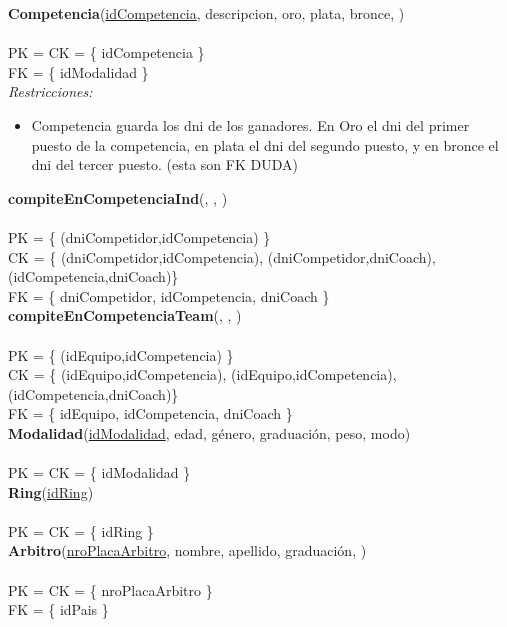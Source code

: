 \noindent\textbf{Competencia}(\uline{idCompetencia}, descripcion, oro, plata, bronce, )
\\
\\
PK = CK = \{ idCompetencia \} \\
FK = \{ idModalidad \} \\

\textit{Restricciones:}
\begin{itemize}
	\item Competencia guarda los dni de los ganadores. En Oro el dni del primer puesto de la competencia, en plata el dni del segundo puesto, y en bronce el dni del tercer puesto. (esta son FK DUDA)
\end{itemize}

\noindent\textbf{compiteEnCompetenciaInd}(, , )
\\
\\
PK = \{ (dniCompetidor,idCompetencia) \} \\
CK = \{ (dniCompetidor,idCompetencia), (dniCompetidor,dniCoach), (idCompetencia,dniCoach)\} \\
FK = \{ dniCompetidor, idCompetencia, dniCoach \} \\

\noindent\textbf{compiteEnCompetenciaTeam}(, , )
\\
\\
PK = \{ (idEquipo,idCompetencia) \} \\
CK = \{ (idEquipo,idCompetencia), (idEquipo,idCompetencia), (idCompetencia,dniCoach)\} \\
FK = \{ idEquipo, idCompetencia, dniCoach \} \\

\noindent\textbf{Modalidad}(\uline{idModalidad}, edad, género, graduación, peso, modo)
\\
\\
PK = CK = \{ idModalidad \} \\

\noindent\textbf{Ring}(\uline{idRing})
\\
\\
PK = CK = \{ idRing \} \\

\noindent\textbf{Arbitro}(\uline{nroPlacaArbitro}, nombre, apellido, graduación, )
\\
\\
PK = CK = \{ nroPlacaArbitro \} \\
FK = \{ idPais \} \\

